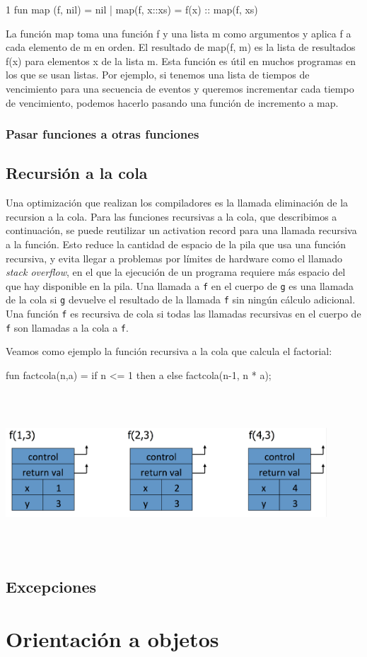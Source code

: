 \documentclass[10pt,a4paper]{report}
\begin{document}
     1
fun map (f, nil) = nil | map(f, x::xs) = f(x) :: map(f, xs)

La función map toma una función f y una lista m como argumentos y aplica f a cada 
elemento de m en orden. El resultado de map(f, m) es la lista de resultados f(x) para 
elementos x de la lista m. Esta función es útil en muchos programas en los que se 
usan listas. Por ejemplo, si tenemos una lista de tiempos de vencimiento para una 
secuencia de eventos y queremos incrementar cada tiempo de vencimiento, 
podemos hacerlo pasando una función de incremento a map.
\subsection{Pasar funciones a otras funciones}



\section{Recursión a la cola}
\par Una optimización que realizan los compiladores es la llamada eliminación de la recursion a la cola. Para las funciones recursivas a la cola, que describimos a continuación, se puede reutilizar un activation record para una llamada recursiva a la
función. Esto reduce la cantidad de espacio de la pila que usa una
función recursiva, y evita llegar a problemas por límites de hardware
como el llamado {\it stack overflow}, en el que la ejecución de un
programa requiere más espacio del que hay disponible en la pila.
Una llamada a \verb|f| en el cuerpo de \verb|g| es una
llamada de la cola si \verb|g| devuelve el resultado de la llamada
\verb|f| sin ningún cálculo adicional. Una función \verb|f| es recursiva de cola si todas las llamadas recursivas en el cuerpo de \verb|f| son llamadas a la cola a \verb|f|. 

Veamos como ejemplo la función recursiva a la cola que calcula el factorial:

\begin{tabbing}
fun factcola(n,a) = if n <= 1 then a else factcola(n-1, n * a);
\end{tabbing}



\begin{center} 	
		\includegraphics[width=12cm, height=6cm]{factorial2.png}
\end{center}


\section{Excepciones}


\chapter{Orientación a objetos}
\end{document}
